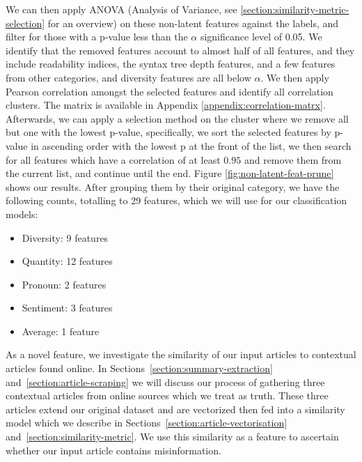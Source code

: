 \documentclass{article}
\begin{document}
We can then apply ANOVA (Analysis of Variance, see \ref{section:similarity-metric-selection} for an overview) on these non-latent features against the labels, and filter for those with a p-value less than the $\alpha$ significance level of 0.05. We identify that the removed features account to almost half of all features, and they include readability indices, the syntax tree depth features, and a few features from other categories, and diversity features are all below $\alpha$. We then apply Pearson correlation amongst the selected features and identify all correlation clusters. The matrix is available in Appendix \ref{appendix:correlation-matrx}. Afterwards, we can apply a selection method on the cluster where we remove all but one with the lowest p-value, specifically, we sort the selected features by p-value in ascending order with the lowest p at the front of the list, we then search for all features which have a correlation of at least $0.95$ and remove them from the current list, and continue until the end. Figure \ref{fig:non-latent-feat-prune} shows our results. After grouping them by their original category, we have the following counts, totalling to 29 features, which we will use for our classification models:
\begin{itemize}
  \item Diversity: 9 features
  \item Quantity: 12 features
  \item Pronoun: 2 features
  \item Sentiment: 3 features
  \item Average: 1 feature
\end{itemize}


As a novel feature, we investigate the similarity of our input articles to contextual articles found online. In Sections~\ref{section:summary-extraction} and~\ref{section:article-scraping} we will discuss our process of gathering three contextual articles from online sources which we treat as truth. These three articles extend our original dataset and are vectorized then fed into a similarity model which we describe in Sections~\ref{section:article-vectorisation} and~\ref{section:similarity-metric}. We use this similarity as a feature to ascertain whether our input article contains misinformation.
\end{document}
